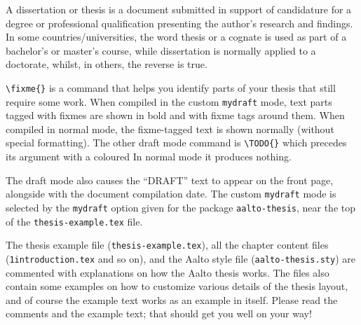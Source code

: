 A dissertation or thesis is a document submitted in support of candidature
for a degree or professional qualification presenting the author's research and
findings. In some countries/universities, the word thesis or a cognate is used
as part of a bachelor's or master's course, while dissertation is normally
applied to a doctorate, whilst, in others, the reverse is true.


\texttt{\textbackslash fixme\{\}} is a command that helps you identify parts of
your thesis that still require some work.
When compiled in the custom \texttt{mydraft} mode, text parts tagged with
fixmes are shown in bold and with fixme tags around them.
When compiled in normal mode, the fixme-tagged text is shown normally (without
special formatting).
The other draft mode command is \texttt{\textbackslash TODO\{\}}
which precedes its argument with a coloured
In normal mode it produces nothing.

The draft mode also causes the ``DRAFT'' text to appear on
the front page, alongside with the document compilation date. The custom
\texttt{mydraft} mode is selected by the \texttt{mydraft} option given for the
package \texttt{aalto-thesis}, near the top of the \texttt{thesis-example.tex}
file.

The thesis example file (\texttt{thesis-example.tex}), all the chapter content
files (\texttt{1introduction.tex} and so on), and the Aalto style file
(\texttt{aalto-thesis.sty}) are commented with explanations on how the Aalto
thesis works. The files also contain some examples on how to customize various
details of the thesis layout, and of course the example text works as an
example in itself. Please read the comments and the example text; that should
get you well on your way!
